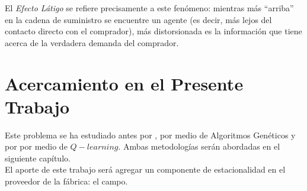 El \textit{Efecto L\'atigo} s\citet{Strozzi}e refiere precisamente a este fenómeno: mientras m\'as ``arriba'' en la cadena de suministro se encuentre un agente (es decir, m\'as lejos del contacto directo con el comprador), m\'as distorsionada es la informaci\'on que tiene acerca de la verdadera demanda del comprador.

\section{Acercamiento en el Presente Trabajo}

Este problema se ha estudiado antes por \citet{Strozzi}, por medio de Algoritmos Genéticos y por \citet{Chaharsooghi} por medio de $Q-learning$. Ambas metodolog\'ias ser\'an abordadas en el siguiente cap\'itulo.\\

El aporte de este trabajo será agregar un componente de estacionalidad en el proveedor de la f\'abrica: el campo.